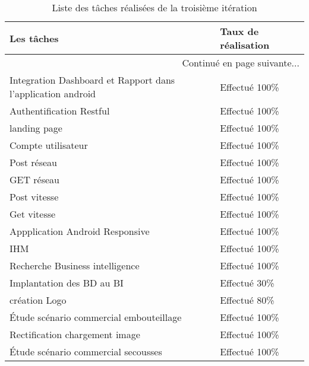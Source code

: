 \begin{center}
    \begin{longtable}{| l | l |}
        \caption{Liste des tâches réalisées de la troisième itération}
\label{tab:sprint3-evaluation} \\

        \hline
        \textbf{Les tâches} & \textbf{Taux de réalisation} \\ \hline
        \endhead

        \hline \multicolumn{2}{|r|}{{Continué en page suivante$\dotsc$}} \\ \hline
        \endfoot

        \hline \hline
        \endlastfoot

        \hline
Integration Dashboard et Rapport dans l'application android & Effectué 100\% \\ \hline
Authentification Restful&  Effectué 100\% \\ \hline
landing page& Effectué 100\% \\ \hline
Compte utilisateur& Effectué 100\% \\ \hline
Post réseau& Effectué 100\% \\ \hline
GET réseau&  Effectué 100\% \\ \hline
Post vitesse&  Effectué 100\% \\ \hline
Get vitesse& Effectué 100\% \\ \hline
Appplication Android Responsive & Effectué 100\% \\ \hline
IHM & Effectué 100\% \\ \hline
Recherche Business intelligence& Effectué 100\% \\ \hline
Implantation des BD au BI & Effectué 30\% \\ \hline
création Logo&  Effectué 80\% \\ \hline
Étude scénario commercial embouteillage& Effectué 100\% \\ \hline
Rectification chargement image & Effectué 100\% \\ \hline
Étude scénario commercial secousses &  Effectué 100\% \\ \hline
\end{longtable}
\end{center}
